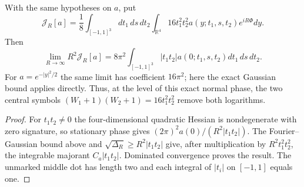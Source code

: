 \begin{corollary}
With the same hypotheses on $a$, put
\[
 \mathcal J_R[a]=\frac18\int_{[-1,1]^3}dt_1\,ds\,dt_2
       \int_{\mathbb R^4}16t_1^2t_2^2a(y;t_1,s,t_2)e^{iR\Phi}dy.
\]
Then
\[
 \lim_{R\to\infty}R^2\mathcal J_R[a]
 =8\pi^2\int_{[-1,1]^3}|t_1t_2|
                       a(0;t_1,s,t_2)dt_1\,ds\,dt_2.
\]
For $a=e^{-|y|^2/2}$ the same limit has coefficient $16\pi^2$; here the exact Gaussian bound applies directly.
Thus, at the level of this exact normal phase, the two central symbols
$(W_1+1)(W_2+1)=16t_1^2t_2^2$ remove both logarithms.
\end{corollary}

\begin{proof}
For $t_1t_2\ne0$ the four-dimensional quadratic Hessian is
nondegenerate with zero signature, so stationary phase gives
$(2\pi)^2a(0)/(R^2|t_1t_2|)$.
The Fourier--Gaussian bound above and
$\sqrt{\Delta_R}\geq R^2|t_1t_2|$ give, after multiplication by
$R^2t_1^2t_2^2$, the integrable majorant $C_a|t_1t_2|$.
Dominated convergence proves the result.  The unmarked middle dot
has length two and each integral of $|t_i|$ on $[-1,1]$ equals one.
\end{proof}
